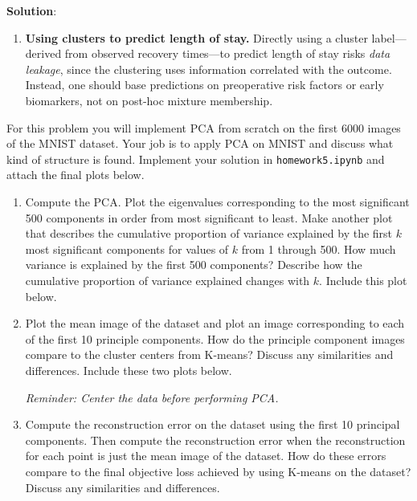 \documentclass[submit]{../harvardml}
\newenvironment{solution}{
    \vspace{2mm}
    \color{blue}\noindent\textbf{Solution}:
}{}
\begin{document}
\begin{solution}
\begin{enumerate}
\item \textbf{Using clusters to predict length of stay.}  
  Directly using a cluster label—derived from observed recovery times—to predict length of stay risks \emph{data leakage}, since the clustering uses information correlated with the outcome.  Instead, one should base predictions on preoperative risk factors or early biomarkers, not on post‐hoc mixture membership.
\end{enumerate}
\end{solution}

\newpage

\begin{problem}

  For this problem you will implement PCA from scratch on the first 6000 images of the MNIST dataset. Your job is to apply PCA on MNIST and discuss what kind of structure is found. Implement your solution in \texttt{homework5.ipynb} and attach the final plots below. \\

  \begin{enumerate}

    \item Compute the PCA. Plot the eigenvalues corresponding to the most
    significant 500 components in order from most significant to
    least. Make another plot that describes the cumulative proportion of
    variance explained by the first $k$ most significant components for
    values of $k$ from 1 through 500.  How much variance is explained by
    the first 500 components?  Describe how the cumulative proportion of
    variance explained changes with $k$.  Include this plot below.

    \item Plot the mean image of the dataset and plot an image
    corresponding to each of the first 10 principle components.  How do
    the principle component images compare to the cluster centers from
    K-means? Discuss any similarities and differences.  Include these
    two plots below.
    
    \textit{Reminder: Center the data before performing PCA.}

    \item Compute the reconstruction error on the dataset using the first 10 principal components. Then compute the reconstruction error when the reconstruction for each point is just the mean
    image of the dataset. How do these errors compare to
    the final objective loss achieved by using K-means on the dataset?
    Discuss any similarities and differences.


\end{enumerate}
\end{problem}
\end{document}
